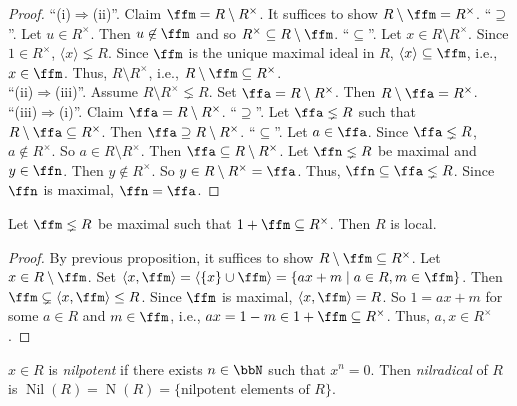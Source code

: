 \begin{proof}
    ``(i)$\Rightarrow$(ii)''. Claim $\ffm = R \setminus R^\times$. It suffices to show $R \setminus \ffm = R^\times$. ``$\supseteq$''. Let $u \in R^\times$. Then $u \not \in \ffm$ and so $R^\times \subseteq R \setminus \ffm$. ``$\subseteq$''. Let $x \in R \setminus R^\times$. Since $1 \in R^\times$, $\langle x \rangle \lneq R$. Since $\ffm$ is the unique maximal ideal in $R$, $\langle x \rangle \subseteq \ffm$, i.e., $x \in \ffm$. Thus, $R \setminus R^\times$, i.e., $R \setminus \ffm \subseteq R^\times$. \\
    ``(ii)$\Rightarrow$(iii)''. Assume $R \setminus R^\times \lneq R$. Set $\ffa = R \setminus R^\times$. Then $R \setminus \ffa = R^\times$. \\
    ``(iii)$\Rightarrow$(i)''. Claim $\ffa = R \setminus R^\times$. ``$\supseteq$''. Let $\ffa \lneq R$ such that $R \setminus \ffa \subseteq R^\times$. Then $\ffa \supseteq R \setminus R^\times$. ``$\subseteq$''. Let $a \in \ffa$. Since $\ffa \lneq R$, $a \not \in R^\times$. So $a \in R \setminus R^\times$. Then $\ffa \subseteq R \setminus R^\times$. Let $\ffn \lneq R$ be maximal and $y \in \ffn$. Then $y \not \in R^\times$. So $y \in R \setminus R^\times = \ffa$. Thus, $\ffn \subseteq \ffa \lneq R$. Since $\ffn$ is maximal, $\ffn = \ffa$. 
\end{proof}

\begin{proposition}
    Let $\ffm \lneq R$ be maximal such that $1 + \ffm \subseteq R^\times$. Then $R$ is local.
\end{proposition}

\begin{proof}
    By previous proposition, it suffices to show $R \setminus \ffm \subseteq R^\times$. Let $x \in R \setminus \ffm$. Set $\langle x, \ffm \rangle = \langle \{x\} \cup \ffm \rangle = \{ax+m \mid a \in R, m \in \ffm\}$. Then $\ffm \subsetneq \langle x, \ffm \rangle \leq R$. Since $\ffm$ is maximal, $\langle x,\ffm \rangle = R$. So $1 = ax + m$ for some $a \in R$ and $m \in \ffm$, i.e., $ax = 1-m \in 1 + \ffm \subseteq R^\times$. Thus, $a,x \in R^\times$.
\end{proof}

\begin{definition}
    $x \in R$ is \emph{nilpotent} if there exists $n \in \bbN$ such that $x^n = 0$. Then \emph{nilradical} of $R$ is $\operatorname{Nil}(R) = \operatorname{N}(R) = \{\text{nilpotent elements of }R\}$.
\end{definition}

